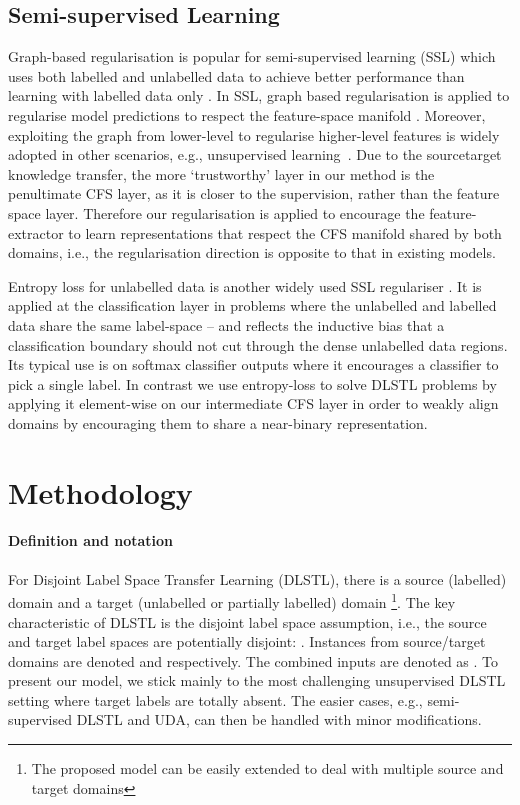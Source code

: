 \documentclass[letterpaper]{article} \usepackage{aaai19}  \usepackage{times}  \usepackage{helvet}  \usepackage{courier}  \usepackage{url}  \usepackage{graphicx}
\begin{document}
\subsection{Semi-supervised Learning}
Graph-based regularisation is popular for semi-supervised learning (SSL) which uses both labelled and unlabelled data to achieve better performance than learning with labelled data only \cite{zhu2006semi,belkin2006laprlsSSL}. 
In SSL,
graph based regularisation is applied to regularise model predictions to respect the feature-space manifold \cite{yue2017semi,nadler2009semi,belkin2006laprlsSSL}. 
Moreover, exploiting the graph from lower-level to regularise higher-level features is widely adopted in other scenarios, e.g., unsupervised learning~\cite{jia2015laplacian,yang2017graph}.
Due to the sourcetarget knowledge transfer, the more `trustworthy' layer in our method is the penultimate CFS layer, as it is closer to the supervision, rather than the feature space layer. 
Therefore our regularisation is applied to encourage the feature-extractor to learn representations that respect the CFS manifold shared by both domains, i.e., the regularisation direction is opposite to that in existing models.

Entropy loss for unlabelled data is another widely used SSL regulariser \cite{zhu2006semi,long2016unsupervised}. It is applied at the classification layer in problems where the unlabelled and labelled data share the same label-space -- and reflects the inductive bias that a classification boundary should not cut through the dense unlabelled data regions. Its typical use is on softmax classifier outputs where it encourages a classifier to pick a single label. In contrast we use entropy-loss to solve DLSTL problems by applying it  element-wise on our intermediate CFS layer in order to weakly align domains by encouraging them to share a near-binary representation. 



\section{Methodology}\label{Sec:Method}

\paragraph{Definition and notation}

For Disjoint Label Space Transfer Learning (DLSTL), there is a source (labelled) domain  and a target (unlabelled or partially labelled) domain \footnote{The proposed model can be easily extended to deal with multiple source and target domains}. The key characteristic of DLSTL is the disjoint label space assumption, i.e., the source  and target  label spaces are potentially disjoint: . Instances from source/target domains are denoted   and  respectively. The combined inputs  are denoted as . To present our model, we stick mainly to the most challenging unsupervised DLSTL setting where target labels are totally absent. The easier cases, e.g., semi-supervised DLSTL and UDA, can then be handled with minor modifications.
\end{document}
